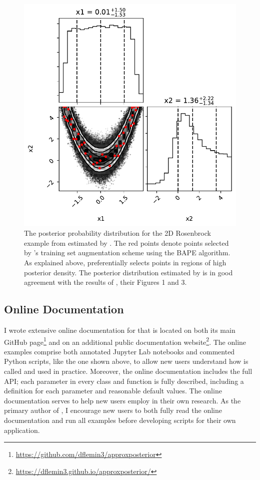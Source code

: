 \begin{figure}
\centering
	\includegraphics[width=\textwidth]{finalPosterior.pdf}
   \caption{The posterior probability distribution for the 2D Rosenbrock example from \citet{Wang2018} estimated by \approxposterior.  The red points denote points selected by \approxposterior's training set augmentation scheme using the BAPE algorithm. As explained above, \approxposterior preferentially selects points in regions of high posterior density. The posterior distribution estimated by \approxposterior is in good agreement with the results of \citet{Wang2018}, their Figures 1 and 3.}%
    \label{AP:fig:rosenbrock}%
\end{figure}

\subsection{Online Documentation} \label{AP:sec:docs}

I wrote extensive online documentation for \approxposterior that is located on both its main GitHub page\footnote{\href{https://github.com/dflemin3/approxposterior}{https://github.com/dflemin3/approxposterior}} and on an additional public documentation website\footnote{\href{https://dflemin3.github.io/approxposterior/}{https://dflemin3.github.io/approxposterior/}}. The online examples comprise both annotated Jupyter Lab notebooks and commented Python scripts, like the one shown above, to allow new users understand how \approxposterior is called and used in practice. Moreover, the online documentation includes the full \approxposterior API; each parameter in every \approxposterior class and function is fully described, including a definition for each parameter and reasonable default values. The online documentation serves to help new users employ \approxposterior in their own research. As the primary author of \approxposterior, I encourage new users to both fully read the online documentation and run all examples before developing scripts for their own application.


